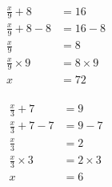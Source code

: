 \documentclass[12pt]{article}
\newcounter{minipagecount}
\begin{document}
\begin{multicols}{2}
\begin{minipage}[t]{0.45\textwidth} %
    \vspace{-26pt}  %
    \raggedright %
    \begin{align*} %
        \frac{x}{9} + 8 &= 16\\
        \frac{x}{9} + 8 - 8 &= 16 - 8\\
        \frac{x}{9} &= 8\\
        \frac{x}{9} \times9 &= 8 \times9\\
        x &= 72\\
    \end{align*}
\end{minipage} %
\noindent{(\theminipagecount)}\hspace{0.1mm} %
\begin{minipage}[t]{0.45\textwidth} %
    \vspace{-26pt}  %
    \raggedright %
    \begin{align*} %
        \frac{x}{3} + 7 &= 9\\
        \frac{x}{3} + 7 - 7 &= 9 - 7\\
        \frac{x}{3} &= 2\\
        \frac{x}{3} \times3 &= 2 \times3\\
        x &= 6\\
    \end{align*}
\end{minipage} %
\noindent{(\theminipagecount)}\hspace{0.1mm} %

\end{multicols}
\end{document}
